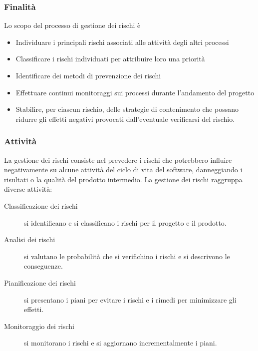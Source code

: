 \documentclass[../../norme-di-progetto.tex]{subfiles}
\begin{document}
\subsubsection{Finalità}%
\label{subs:gestione_dei_rischi/finalita}
Lo scopo del processo di gestione dei rischi è
\begin{itemize}
  \item Individuare i principali rischi associati alle attività degli altri processi
  \item Classificare i rischi individuati per attribuire loro una priorità
  \item Identificare dei metodi di prevenzione dei rischi
  \item Effettuare continui monitoraggi sui processi durante l'andamento del progetto
  \item Stabilire, per ciascun rischio, delle strategie di contenimento che possano ridurre gli effetti negativi provocati dall'eventuale verificarsi del rischio.
\end{itemize}

\subsubsection{Attività}%
\label{subs:attivita}
La gestione dei rischi consiste nel prevedere i rischi che potrebbero influire negativamente su alcune attività del ciclo di vita del software, danneggiando i risultati o la qualità del prodotto intermedio.
La gestione dei rischi raggruppa diverse attività:

\begin{description}
  \item [Classificazione dei rischi] si identificano e si classificano i rischi per il progetto e il prodotto.
  \item [Analisi dei rischi] si valutano le probabilità che si verifichino i rischi e si descrivono le conseguenze.
  \item [Pianificazione dei rischi] si presentano i piani per evitare i rischi e i rimedi per minimizzare gli effetti.
  \item [Monitoraggio dei rischi] si monitorano i rischi e si aggiornano incrementalmente i piani.
\end{description}
\end{document}
